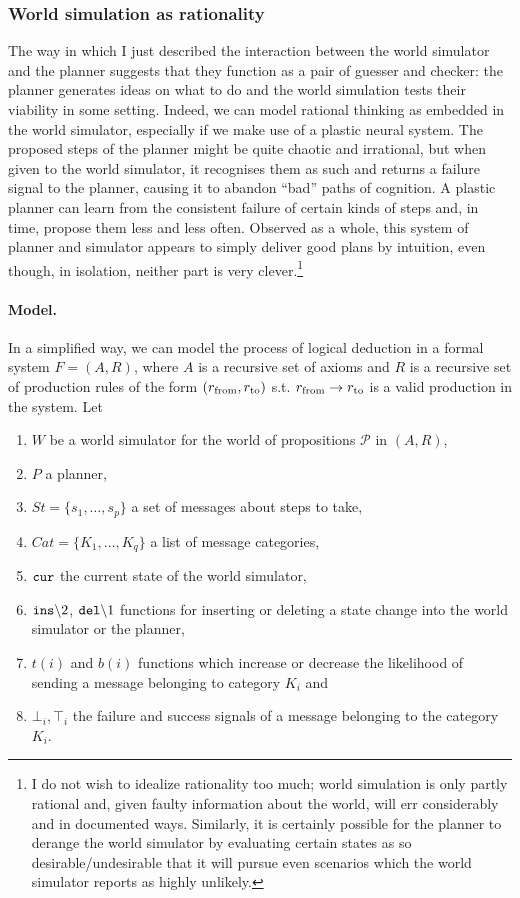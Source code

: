 \subsubsection{World simulation as rationality}
The way in which I just described the interaction between the world simulator and the planner suggests that they function as a pair of guesser and checker: the planner generates ideas on what to do and the world simulation tests their viability in some setting. Indeed, we can model rational thinking as embedded in the world simulator, especially if we make use of a plastic neural system. The proposed steps of the planner might be quite chaotic and irrational, but when given to the world simulator, it recognises them as such and returns a failure signal to the planner, causing it to abandon ``bad'' paths of cognition. A plastic planner can learn from the consistent failure of certain kinds of steps and, in time, propose them less and less often. Observed as a whole, this system of planner and simulator appears to simply deliver good plans by intuition, even though, in isolation, neither part is very clever.\footnote{I do not wish to idealize rationality too much; world simulation is only partly rational and, given faulty information about the world, will err considerably and in documented ways. Similarly, it is certainly possible for the planner to derange the world simulator by evaluating certain states as so desirable/undesirable that it will pursue even scenarios which the world simulator reports as highly unlikely.}

\paragraph{Model.} In a simplified way, we can model the process of logical deduction in a formal system $F = (A, R)$, where $A$ is a recursive set of axioms and $R$ is a recursive set of production rules of the form $(r_{\mt{from}}, r_{\mt{to}})$ s.t. $r_{\mt{from}} \rightarrow r_{\mt{to}}$ is a valid production in the system. Let
	\begin{enumerate}
		\item $W$ be a world simulator for the world of propositions $\mathcal{P}$ in $(A,R)$,
		\item $P$ a planner,
		\item $St = \{s_1,\dots,s_p\}$ a set of messages about steps to take,
		\item $Cat = \{K_1,\dots,K_q\}$ a list of message categories,
		\item $\tt{cur}$ the current state of the world simulator,
		\item $\tt{ins}\backslash 2$, $\tt{del}\backslash 1$ functions for inserting or deleting a state change into the world simulator or the planner,
		\item $t(i)$ and $b(i)$ functions which increase or decrease the likelihood of sending a message belonging to category $K_i$ and 
		\item $\bot_{i}, \top_{i}$ the failure and success signals of a message belonging to the category $K_i$.
	\end{enumerate}
	
